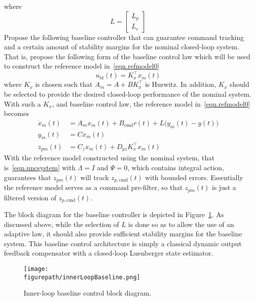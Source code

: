 where
\begin{equation*}
  L =
  \begin{bmatrix}
    L_{p} \\
    L_{e}
  \end{bmatrix}
\end{equation*}
Propose the following baseline controller that can guarantee command tracking and a certain amount of stability margins for the nominal closed-loop system.
That is, propose the following form of the baseline control law which will be used to construct the reference model in\ \eqref{eqn.refmodel0}
\begin{equation}
  \label{eqn.ubl}
  u_{\text{bl}}(t) = K_{x}^{\top}x_{m}(t)
\end{equation}
where $K_{x}$ is chosen such that $A_{m}=A+BK_{x}^{\top}$ is Hurwitz.
In addition, $K_{x}$ should be selected to provide the desired closed-loop performance of the nominal system.
With such a $K_{x}$, and baseline control law, the reference model in\ \eqref{eqn.refmodel0} becomes
\begin{equation}
  \label{eqn.refmodel}
  \begin{split}
    \dot{x}_{m}(t) &= A_{m}x_{m}(t) + B_{\text{cmd}}r(t) + L\bigr(y_{m}(t)-y(t)\bigr) \\
    y_{m}(t) &= Cx_{m}(t) \\
    z_{pm}(t) &= C_{z}x_{m}(t) + D_{pz}K_{x}^{\top}x_{m}(t)
  \end{split}
\end{equation}
With the reference model constructed using the nominal system, that is\ \eqref{eqn.uncsystem} with $\Lambda=I$ and $\Psi=0$, which contains integral action, guarantees that $z_{pm}(t)$ will track $z_{p,\text{cmd}}(t)$ with bounded errors.
Essentially the reference model serves as a command pre-filter, so that $z_{pm}(t)$ is just a filtered version of $z_{p,\text{cmd}}(t)$.

The block diagram for the baseline controller is depicted in Figure~\ref{fig.innerLoopBaseline}.
As discussed above, while the selection of $L$ is done so as to allow the use of an adaptive law, it should also provide sufficient stability margins for the baseline system.
This baseline control architecture is simply a classical dynamic output feedback compensator with a closed-loop Luenberger state estimator.

\begin{figure}[H]
  \begin{center}
    \texttt{[image: \\figurepath/innerLoopBaseline.png]}
    \vspace{-0.1in}
    \caption{Inner-loop baseline control block diagram.\label{fig.innerLoopBaseline}}
  \end{center}
\end{figure}

